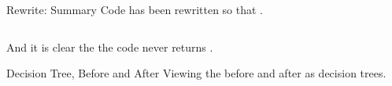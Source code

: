 \begin{frame}{Rewrite: Summary}
  Code has been rewritten so that .

  \begin{columns}
    \begin{column}{0.5\textwidth}
      \usebox\typecaseAbox
    \end{column}
    \begin{column}{0.5\textwidth}  %
      \usebox\typecaseKbox
    \end{column}
  \end{columns}

  And it is clear the the code never returns .

\end{frame}

\begin{frame}{Decision Tree, Before and After}
  Viewing the  before and after as decision trees.

  \begin{columns}
    \begin{column}{0.5\textwidth}
      \usebox\typecaseITEbox
    \end{column}
    \begin{column}{0.5\textwidth}  %
      \usebox\typecaseITEafterbox
    \end{column}
  \end{columns}
\end{frame}




